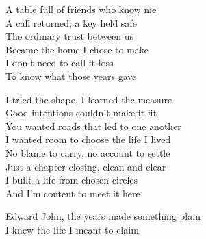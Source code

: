 \begin{lyrics}
A table full of friends who know me\\
A call returned, a key held safe\\
The ordinary trust between us\\
Became the home I chose to make\\
I don’t need to call it loss\\
To know what those years gave

I tried the shape, I learned the measure\\
Good intentions couldn’t make it fit\\
You wanted roads that led to one another\\
I wanted room to choose the life I lived\\
No blame to carry, no account to settle\\
Just a chapter closing, clean and clear\\
I built a life from chosen circles\\
And I’m content to meet it here

Edward John, the years made something plain\\
I knew the life I meant to claim
\end{lyrics}


